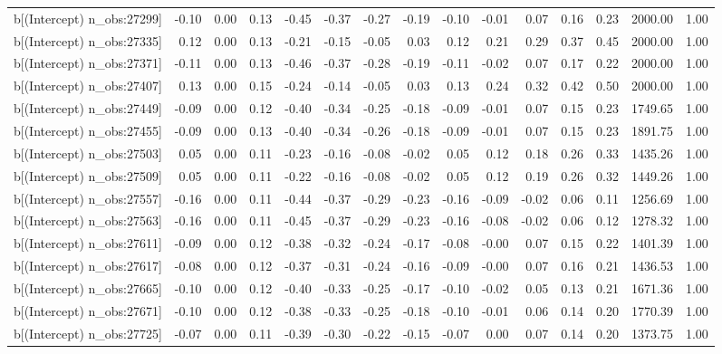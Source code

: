\begin{table}[ht]
\begin{tabular}{rrrrrrrrrrrrrrr}
  b[(Intercept) n\_obs:27299] & -0.10 & 0.00 & 0.13 & -0.45 & -0.37 & -0.27 & -0.19 & -0.10 & -0.01 & 0.07 & 0.16 & 0.23 & 2000.00 & 1.00 \\ 
  b[(Intercept) n\_obs:27335] & 0.12 & 0.00 & 0.13 & -0.21 & -0.15 & -0.05 & 0.03 & 0.12 & 0.21 & 0.29 & 0.37 & 0.45 & 2000.00 & 1.00 \\ 
  b[(Intercept) n\_obs:27371] & -0.11 & 0.00 & 0.13 & -0.46 & -0.37 & -0.28 & -0.19 & -0.11 & -0.02 & 0.07 & 0.17 & 0.22 & 2000.00 & 1.00 \\ 
  b[(Intercept) n\_obs:27407] & 0.13 & 0.00 & 0.15 & -0.24 & -0.14 & -0.05 & 0.03 & 0.13 & 0.24 & 0.32 & 0.42 & 0.50 & 2000.00 & 1.00 \\ 
  b[(Intercept) n\_obs:27449] & -0.09 & 0.00 & 0.12 & -0.40 & -0.34 & -0.25 & -0.18 & -0.09 & -0.01 & 0.07 & 0.15 & 0.23 & 1749.65 & 1.00 \\ 
  b[(Intercept) n\_obs:27455] & -0.09 & 0.00 & 0.13 & -0.40 & -0.34 & -0.26 & -0.18 & -0.09 & -0.01 & 0.07 & 0.15 & 0.23 & 1891.75 & 1.00 \\ 
  b[(Intercept) n\_obs:27503] & 0.05 & 0.00 & 0.11 & -0.23 & -0.16 & -0.08 & -0.02 & 0.05 & 0.12 & 0.18 & 0.26 & 0.33 & 1435.26 & 1.00 \\ 
  b[(Intercept) n\_obs:27509] & 0.05 & 0.00 & 0.11 & -0.22 & -0.16 & -0.08 & -0.02 & 0.05 & 0.12 & 0.19 & 0.26 & 0.32 & 1449.26 & 1.00 \\ 
  b[(Intercept) n\_obs:27557] & -0.16 & 0.00 & 0.11 & -0.44 & -0.37 & -0.29 & -0.23 & -0.16 & -0.09 & -0.02 & 0.06 & 0.11 & 1256.69 & 1.00 \\ 
  b[(Intercept) n\_obs:27563] & -0.16 & 0.00 & 0.11 & -0.45 & -0.37 & -0.29 & -0.23 & -0.16 & -0.08 & -0.02 & 0.06 & 0.12 & 1278.32 & 1.00 \\ 
  b[(Intercept) n\_obs:27611] & -0.09 & 0.00 & 0.12 & -0.38 & -0.32 & -0.24 & -0.17 & -0.08 & -0.00 & 0.07 & 0.15 & 0.22 & 1401.39 & 1.00 \\ 
  b[(Intercept) n\_obs:27617] & -0.08 & 0.00 & 0.12 & -0.37 & -0.31 & -0.24 & -0.16 & -0.09 & -0.00 & 0.07 & 0.16 & 0.21 & 1436.53 & 1.00 \\ 
  b[(Intercept) n\_obs:27665] & -0.10 & 0.00 & 0.12 & -0.40 & -0.33 & -0.25 & -0.17 & -0.10 & -0.02 & 0.05 & 0.13 & 0.21 & 1671.36 & 1.00 \\ 
  b[(Intercept) n\_obs:27671] & -0.10 & 0.00 & 0.12 & -0.38 & -0.33 & -0.25 & -0.18 & -0.10 & -0.01 & 0.06 & 0.14 & 0.20 & 1770.39 & 1.00 \\ 
  b[(Intercept) n\_obs:27725] & -0.07 & 0.00 & 0.11 & -0.39 & -0.30 & -0.22 & -0.15 & -0.07 & 0.00 & 0.07 & 0.14 & 0.20 & 1373.75 & 1.00 \\ 

\end{tabular}
\end{table}
